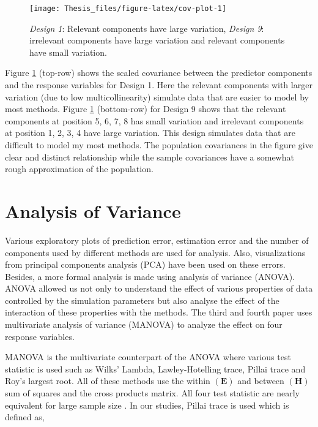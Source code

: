 \documentclass[11pt,twoside,openright,titlepage,
  headinclude,footinclude,BCOR=5mm,
  numbers=noenddot,cleardoublepage=empty,
  tablecaptionabove, dottedtoc,
  bibliography=totoc,paper=a4]{scrreprt}
\begin{document}
\begin{figure}[!htb]
\texttt{[image: Thesis\_files/figure-latex/cov-plot-1]} \caption{\emph{Design 1}: Relevant components have large variation, \emph{Design 9}: irrelevant components have large variation and relevant components have small variation.}\label{fig:cov-plot}
\end{figure}

Figure \ref{fig:cov-plot} (top-row) shows the scaled covariance between the predictor components and the response variables for Design 1. Here the relevant components with larger variation (due to low multicollinearity) simulate data that are easier to model by most methods. Figure \ref{fig:cov-plot} (bottom-row) for Design 9 shows that the relevant components at position 5, 6, 7, 8 has small variation and irrelevant components at position 1, 2, 3, 4 have large variation. This design simulates data that are difficult to model my most methods. The population covariances in the figure give clear and distinct relationship while the sample covariances have a somewhat rough approximation of the population.

\hypertarget{analysis-of-variance}{%
\section{Analysis of Variance}\label{analysis-of-variance}}

Various exploratory plots of prediction error, estimation error and the number of components used by different methods are used for analysis. Also, visualizations from principal components analysis (PCA) have been used on these errors. Besides, a more formal analysis is made using analysis of variance (ANOVA). ANOVA allowed us not only to understand the effect of various properties of data controlled by the simulation parameters but also analyse the effect of the interaction of these properties with the methods. The third and fourth paper uses multivariate analysis of variance (MANOVA) to analyze the effect on four response variables.

MANOVA is the multivariate counterpart of the ANOVA where various test statistic is used such as Wilks' Lambda, Lawley-Hotelling trace, Pillai trace and Roy's largest root. All of these methods use the within \((\mathbf{E})\) and between \((\mathbf{H})\) sum of squares and the cross products matrix. All four test statistic are nearly equivalent for large sample size \citep{johnson2018applied}. In our studies, Pillai trace is used which is defined as,
\end{document}

